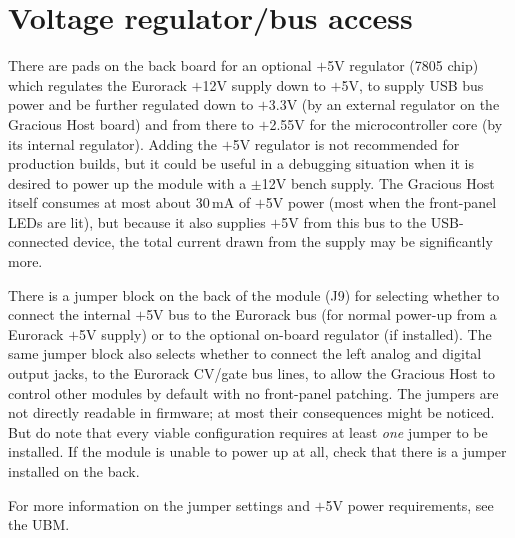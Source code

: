 \section{Voltage regulator/bus access}

There are pads on the back board for an optional $+$5V regulator (7805
chip) which regulates the Eurorack $+$12V supply down to $+$5V, to supply
USB bus power and be further regulated down to $+$3.3V (by an external
regulator on the Gracious Host board) and from there to $+$2.55V for the
microcontroller core (by its internal regulator).  Adding the $+$5V
regulator is not recommended for production builds, but it could be useful
in a debugging situation when it is desired to power up the module with a
$\pm$12V bench supply.  The Gracious Host itself consumes at most about
30\,mA of $+$5V power (most when the front-panel LEDs are lit), but because
it also supplies $+$5V from this bus to the USB-connected device, the total
current drawn from the supply may be significantly more.

There is a jumper block on the back of the module (J9) for selecting whether
to connect the internal $+$5V bus to the Eurorack bus (for normal power-up
from a Eurorack $+$5V supply) or to the optional on-board regulator (if
installed).  The same jumper block also selects whether to connect the left
analog and digital output jacks, to the Eurorack CV/gate bus lines, to allow
the Gracious Host to control other modules by default with no front-panel
patching.  The jumpers are not directly readable in firmware; at most their
consequences might be noticed.  But do note that every viable configuration
requires at least \emph{one} jumper to be installed.  If the module is
unable to power up at all, check that there is a jumper installed on the
back.

For more information on the jumper settings and $+$5V power requirements,
see the UBM.
